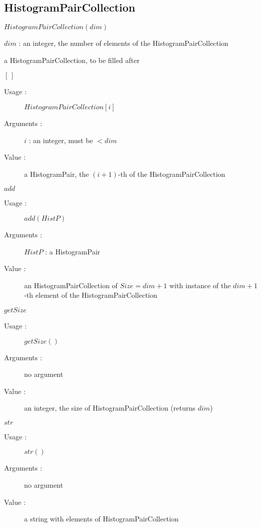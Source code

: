 
\newpage \subsection{HistogramPairCollection}

\begin{description}

\item[Usage :] $HistogramPairCollection(dim)$

\item[Arguments :]  $dim$ : an integer, the number of elements of the HistogramPairCollection

\item[Value :] a HistogramPairCollection, to be filled after

\item[Some methods :]  \rule{0pt}{1em}

  \begin{description}

  \item $[\,]$
    \begin{description}
    \item[Usage :] $HistogramPairCollection[i]$
    \item[Arguments :]$i$ : an integer, must be $<dim$
    \item[Value :] a HistogramPair, the $(i+1)$-th of the HistogramPairCollection
    \end{description}


  \item $add$
    \begin{description}
    \item[Usage :] $add(HistP)$
    \item[Arguments :] $HistP$ : a HistogramPair
    \item[Value :]        an HistogramPairCollection of $Size = dim +1$
      with instance of the $dim +1$-th element of the HistogramPairCollection
    \end{description}

  \item $getSize$
    \begin{description}
    \item[Usage :] $getSize()$
    \item[Arguments :] no argument
    \item[Value :]    an integer, the size of HistogramPairCollection (returns $dim$)
    \end{description}

  \item $str$
    \begin{description}
    \item[Usage :] $str()$
    \item[Arguments :] no argument
    \item[Value :]      a string with elements of HistogramPairCollection
    \end{description}

  \end{description}

\end{description}

